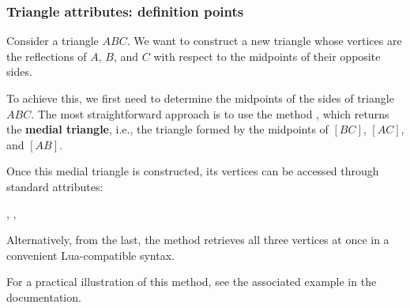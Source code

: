 \subsubsection{Triangle attributes: definition points}
\label{ssub:triangle_attributes_points}

Consider a triangle $ABC$. We want to construct a new triangle whose vertices are the reflections of $A$, $B$, and $C$ with respect to the midpoints of their opposite sides.

\medskip
\noindent
To achieve this, we first need to determine the midpoints of the sides of triangle $ABC$. The most straightforward approach is to use the method , which returns the \textbf{medial triangle}, i.e., the triangle formed by the midpoints of $[BC]$, $[AC]$, and $[AB]$.

\medskip
\noindent
Once this medial triangle is constructed, its vertices can be accessed through standard attributes:
\begin{center}
, , 
\end{center}

\noindent
Alternatively, from the last, the method  retrieves all three vertices at once in a convenient Lua-compatible syntax.

\medskip
\noindent
For a practical illustration of this method, see  the associated  example in the documentation.

\vspace{1em}

\begin{minipage}{.5\textwidth-2cm}
\begin{center}
\end{center}
\end{minipage}
\begin{minipage}{.5\textwidth}
\begin{tkzexample}
\end{tkzexample}
\end{minipage}

